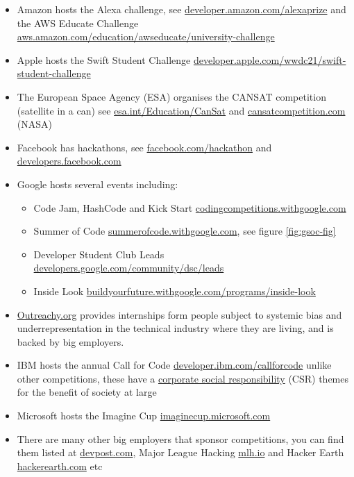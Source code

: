 \documentclass[
]{book}
\providecommand{\tightlist}{%
  \setlength{\itemsep}{0pt}\setlength{\parskip}{0pt}}
\begin{document}
\begin{itemize}
\tightlist
\item
  Amazon hosts the Alexa challenge, see \href{https://developer.amazon.com/alexaprize/challenges/current-challenge/rules}{developer.amazon.com/alexaprize} and the AWS Educate Challenge \href{https://aws.amazon.com/education/awseducate/university-challenge/}{aws.amazon.com/education/awseducate/university-challenge}
\item
  Apple hosts the Swift Student Challenge \href{https://developer.apple.com/wwdc21/swift-student-challenge/}{developer.apple.com/wwdc21/swift-student-challenge}
\item
  The European Space Agency (ESA) organises the CANSAT competition (satellite in a can) see \href{https://www.esa.int/Education/CanSat}{esa.int/Education/CanSat} and \href{http://www.cansatcompetition.com/}{cansatcompetition.com} (NASA)
\item
  Facebook has hackathons, see \href{https://en-gb.facebook.com/hackathon}{facebook.com/hackathon} and \href{https://developers.facebook.com/}{developers.facebook.com}
\item
  Google hosts several events including:

  \begin{itemize}
  \tightlist
  \item
    Code Jam, HashCode and Kick Start \href{https://codingcompetitions.withgoogle.com/}{codingcompetitions.withgoogle.com}
  \item
    Summer of Code \href{https://summerofcode.withgoogle.com/}{summerofcode.withgoogle.com}, see figure \ref{fig:gsoc-fig} \citep{gsoc}
  \item
    Developer Student Club Leads \href{https://developers.google.com/community/dsc/leads}{developers.google.com/community/dsc/leads}
  \item
    Inside Look \href{https://buildyourfuture.withgoogle.com/programs/inside-look/}{buildyourfuture.withgoogle.com/programs/inside-look}
  \end{itemize}
\item
  \href{https://www.outreachy.org/}{Outreachy.org} provides internships form people subject to systemic bias and underrepresentation in the technical industry where they are living, and is backed by big employers.
\item
  IBM hosts the annual Call for Code \href{https://developer.ibm.com/callforcode}{developer.ibm.com/callforcode} unlike other competitions, these have a \href{https://en.wikipedia.org/wiki/Corporate_social_responsibility}{corporate social responsibility} (CSR) themes for the benefit of society at large
\item
  Microsoft hosts the Imagine Cup \href{https://imaginecup.microsoft.com/}{imaginecup.microsoft.com}
\item
  There are many other big employers that sponsor competitions, you can find them listed at \href{https://devpost.com}{devpost.com}, Major League Hacking \href{https://mlh.io/}{mlh.io} and Hacker Earth \href{https://www.hackerearth.com/}{hackerearth.com} etc
\end{itemize}
\end{document}
